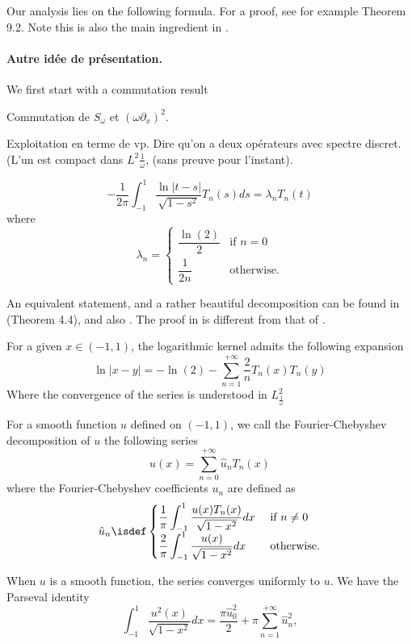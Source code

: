 \documentclass[]{article}
\begin{document}
Our analysis lies on the following formula. For a proof, see for example \cite{mason2002chebyshev} Theorem 9.2. Note this is also the main ingredient in \cite{bruno2012second}.


\paragraph{Autre idée de présentation.}
We first start with a commutation result
\begin{Prop}
	Commutation de $S_\omega$ et $(\omega \partial_x)^2$. 
\end{Prop}
Exploitation en terme de vp. Dire qu'on a deux opérateurs avec spectre discret. (L'un est compact dans $L^2\frac{1}{\omega}$, (sans preuve pour l'instant).

\begin{Prop}
	\[ -\frac{1}{2\pi}\int_{-1}^{1} \frac{\ln|t-s|}{\sqrt{1 - s^2}}T_n(s)ds = \lambda_n T_n(t)\]
	where
	\[\lambda_n = \begin{cases}
	\dfrac{\ln(2)}{2} & \text{if } n=0\\
	\dfrac{1}{2n} & \text{otherwise}.
	\end{cases}\]
	\label{STn}
\end{Prop}
An equivalent statement, and a rather beautiful decomposition can be found in \cite{jerez2012explicit} (Theorem 4.4), and also \cite{urzua2014optimal}. The proof in \cite{jerez2012explicit} is different from that of \cite{mason2002chebyshev}.
\begin{The}	
	For a given $x \in (-1,1)$, the logarithmic kernel admits the following expansion 
	\[ \ln|x-y| = -\ln(2) - \sum_{n=1}^{+\infty} \frac{2}{n}T_n(x)T_n(y)\]
	Where the convergence of the series is understood in $L^2_\frac{1}{\omega}$
\end{The}

\begin{Def}
	For a smooth function $u$ defined on $(-1,1)$, we call the Fourier-Chebyshev decomposition of $u$ the following series 
	\[ u(x) = \sum_{n=0}^{+\infty} \hat{u}_n T_n(x)\]
	where the Fourier-Chebyshev coefficients $u_n$ are defined as 
	\[ \hat{u}_n \isdef \begin{cases}
	\dfrac{1}{\pi}\displaystyle\int_{-1}^{1} \dfrac{u(x) T_n(x)}{\sqrt{1-x^2}}dx & \text{ if } n \neq 0\\
	\dfrac{2}{\pi}\displaystyle\int_{-1}^{1} \dfrac{u(x)}{\sqrt{1-x^2}}dx & \text{ otherwise.}\\
	\end{cases}\]
\end{Def}
When $u$ is a smooth function, the series converges uniformly to $u$. We have the Parseval identity 
\[ \int_{-1}^{1} \frac{u^2(x)}{\sqrt{1-x^2}} dx =  \frac{\pi \hat{u}_0^2}{2} + \pi\sum_{n=1}^{+\infty}\hat{u}_n^2,\]
\end{document}
